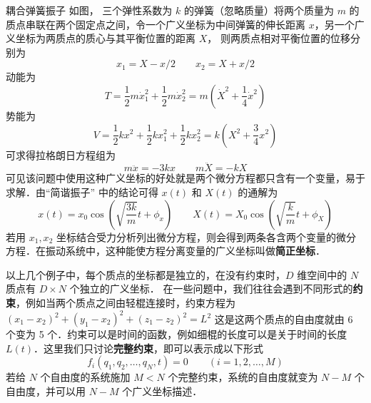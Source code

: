 \begin{exam}{耦合弹簧振子}
如图，%
三个弹性系数为 $k$ 的弹簧（忽略质量）将两个质量为 $m$ 的质点串联在两个固定点之间，令一个广义坐标为中间弹簧的伸长距离 $x$，另一个广义坐标为两质点的质心与其平衡位置的距离 $X$， 则两质点相对平衡位置的位移分别为
\begin{equation}
x_1=X-x/2 \qquad x_2 = X+x/2
\end{equation}
动能为
\begin{equation}
T=\frac{1}{2}m\dot x_1^2 + \frac{1}{2}m\dot x_2^2 = m\left( {{{\dot X}^2} + \frac{1}{4}{{\dot x}^2}} \right)
\end{equation}
势能为
\begin{equation}
V = \frac{1}{2}k{x^2} + \frac{1}{2}kx_1^2 + \frac{1}{2}kx_2^2 = k\left( X^2 + \frac 34 x^2 \right)
\end{equation}
可求得拉格朗日方程组为
\begin{equation}
m\ddot x =  - 3kx \qquad m\ddot X =  - kX
\end{equation}
可见该问题中使用这种广义坐标的好处就是两个微分方程都只含有一个变量，易于求解．由“简谐振子” 中的结论可得 $x(t)$ 和 $X(t)$ 的通解为
\begin{equation}
x(t) = {x_0}\cos \left( {\sqrt {\frac{{3k}}{m}} t + {\phi _x}} \right)
\qquad
X(t) = {X_0}\cos \left( {\sqrt {\frac{k}{m}} t + {\phi _X}} \right)
\end{equation}
若用 $x_1, x_2$ 坐标结合受力分析列出微分方程，则会得到两条各含两个变量的微分方程．在振动系统中，这种能使方程分离变量的广义坐标叫做\textbf{简正坐标}．%
\end{exam}
\phantom{=}

以上几个例子中，每个质点的坐标都是独立的，在没有约束时，$D$ 维空间中的 $N$ 质点有 $D\times N$ 个独立的广义坐标． 在一些问题中，我们往往会遇到不同形式的\textbf{约束}，例如当两个质点之间由轻棍连接时，约束方程为 $(x_1-x_2)^2+(y_1-x_2)^2+(z_1-z_2)^2=L^2$ 这是这两个质点的自由度就由 6 个变为 5 个．约束可以是时间的函数，例如细棍的长度可以是关于时间的长度 $L(t)$．这里我们只讨论\textbf{完整约束}，即可以表示成以下形式
\begin{equation}
f_i(q_1,q_2,\dots ,q_N,t) = 0 \qquad (i = 1,2,\dots,M)
\end{equation}
若给 $N$ 个自由度的系统施加 $M<N$ 个完整约束，系统的自由度就变为 $N-M$ 个自由度，并可以用 $N-M$ 个广义坐标描述．

